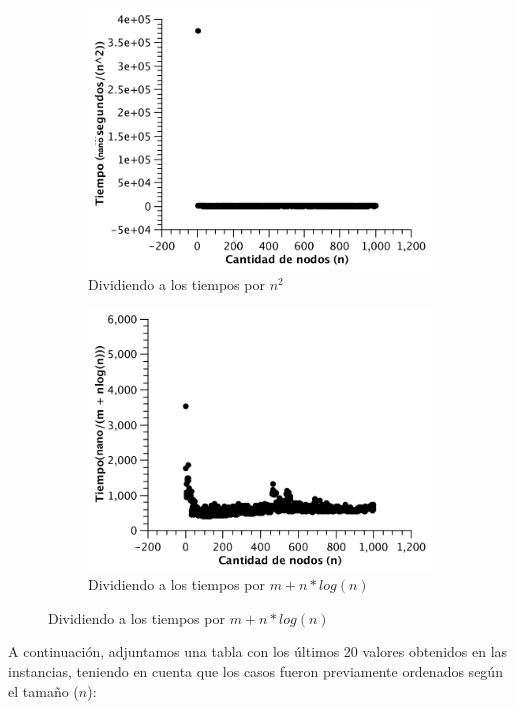 \begin{figure}[H]
        \centering
         \begin{subfigure}[b]{0.5\textwidth}
                \includegraphics[width=\textwidth]{imagenes/completo-listas-3.pdf}
                \caption{Dividiendo a los tiempos por $n^2$}
        \end{subfigure}

        \begin{subfigure}[b]{0.5\textwidth}
                \includegraphics[width=\textwidth]{imagenes/completo-listas-4.pdf}
                \caption{Dividiendo a los tiempos por $m + n*log(n)$}
        \end{subfigure}
\end{figure}
A continuación, adjuntamos una tabla con los últimos 20 valores obtenidos en las instancias, teniendo en cuenta que los casos fueron previamente ordenados según el tamaño ($n$):

